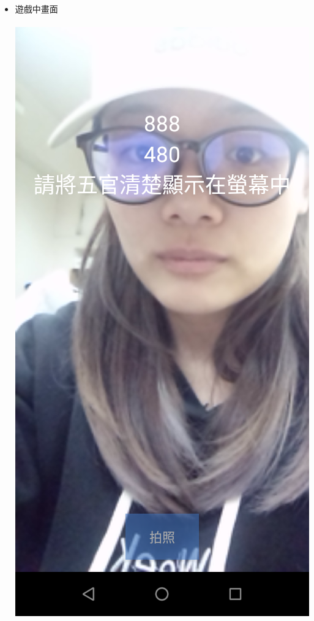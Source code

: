 \documentclass[12pt]{article}  %
\theoremstyle{plain}
\begin{document}
\begin{itemize}
\item 遊戲中畫面 \\ \\
\includegraphics[scale=0.2]{pic/ch4/game03.png}
\space \space

\end{itemize}
\end{document}
